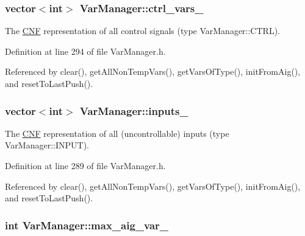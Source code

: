 \hypertarget{classVarManager_acb66edc1a4fc8ccc25321a59fe1668ff}{
\subsubsection[{ctrl\-\_\-vars\-\_\-}]{\setlength{\rightskip}{0pt plus 5cm}vector$<$int$>$ Var\-Manager\-::ctrl\-\_\-vars\-\_\-\hspace{0.3cm}{\ttfamily [protected]}}}\label{classVarManager_acb66edc1a4fc8ccc25321a59fe1668ff}


The \hyperlink{classCNF}{C\-N\-F} representation of all control signals (type Var\-Manager\-::\-C\-T\-R\-L). 



Definition at line 294 of file Var\-Manager.\-h.



Referenced by clear(), get\-All\-Non\-Temp\-Vars(), get\-Vars\-Of\-Type(), init\-From\-Aig(), and reset\-To\-Last\-Push().

\hypertarget{classVarManager_a04609c1f6a3c87c10abcfbd3850a2f87}{
\subsubsection[{inputs\-\_\-}]{\setlength{\rightskip}{0pt plus 5cm}vector$<$int$>$ Var\-Manager\-::inputs\-\_\-\hspace{0.3cm}{\ttfamily [protected]}}}\label{classVarManager_a04609c1f6a3c87c10abcfbd3850a2f87}


The \hyperlink{classCNF}{C\-N\-F} representation of all (uncontrollable) inputs (type Var\-Manager\-::\-I\-N\-P\-U\-T). 



Definition at line 289 of file Var\-Manager.\-h.



Referenced by clear(), get\-All\-Non\-Temp\-Vars(), get\-Vars\-Of\-Type(), init\-From\-Aig(), and reset\-To\-Last\-Push().

\hypertarget{classVarManager_af5877424c2c4ef563bd3278f85dd3c2d}{
\subsubsection[{max\-\_\-aig\-\_\-var\-\_\-}]{\setlength{\rightskip}{0pt plus 5cm}int Var\-Manager\-::max\-\_\-aig\-\_\-var\-\_\-\hspace{0.3cm}{\ttfamily [protected]}}}\label{classVarManager_af5877424c2c4ef563bd3278f85dd3c2d}


